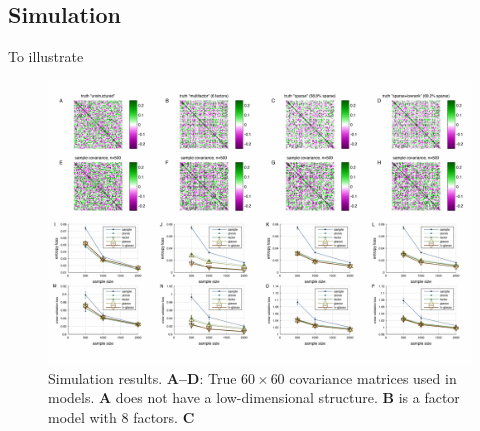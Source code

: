 \subsection*{Simulation}
To illustrate 

\begin{figure}[htp]
\centering
\includegraphics[width=1.0\textwidth]{figures/Figure3.pdf}
\caption{
Simulation results.
\textbf{A--D}: True $60\times60$ covariance matrices used in models. \textbf{A} does not have a low-dimensional structure.  \textbf{B} is a factor model with 8 factors. \textbf{C}
}\label{fig:03}
\end{figure}


